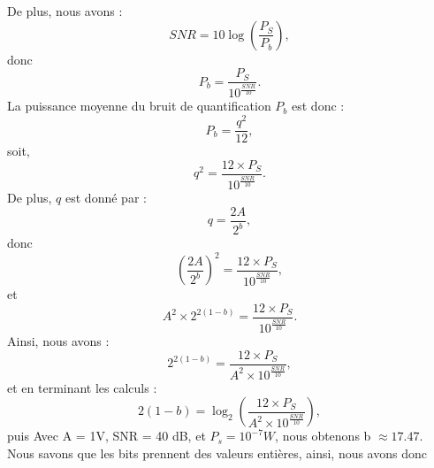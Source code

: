 De plus, nous avons :
\begin{equation}
SNR = 10 \log \left( \frac{P_S}{P_b} \right),
\end{equation}
donc
\begin{equation}
P_b = \frac{P_S}{10^{\frac{SNR}{10}}}.
\end{equation}
La puissance moyenne du bruit de quantification \( P_b \) est donc :
\begin{equation}
P_b = \frac{q^2}{12},
\end{equation}
soit,
\begin{equation}
q^2 = \frac{12 \times P_S}{10^{\frac{SNR}{10}}}.
\end{equation}
De plus, \( q \) est donné par :
\begin{equation}
q = \frac{2A}{2^b},
\end{equation}
donc
\begin{equation}
\left( \frac{2A}{2^b} \right)^2 = \frac{12 \times P_S}{10^{\frac{SNR}{10}}},
\end{equation}
et
\begin{equation}
A^2 \times 2^{2(1-b)} = \frac{12 \times P_S}{10^{\frac{SNR}{10}}}.
\end{equation}
Ainsi, nous avons :
\begin{equation}
2^{2(1-b)} = \frac{12 \times P_S}{A^2 \times 10^{\frac{SNR}{10}}},
\end{equation}
et en terminant les calculs :
\begin{equation}
2(1-b) = \log_2 \left( \frac{12 \times P_S}{A^2 \times 10^{\frac{SNR}{10}}} \right),
\end{equation}
puis
Avec A = 1V, SNR = 40 dB, et $P_s = 10 ^{-7} W$, nous obtenons b $\approx 17.47.$
\\
Nous savons que les bits prennent des valeurs entières, ainsi, nous avons donc 

